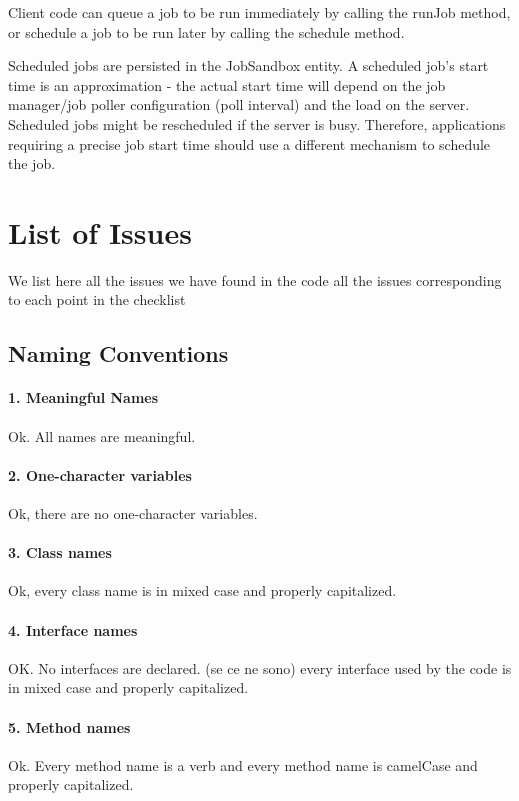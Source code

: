 \documentclass[english]{article}
\begin{document}
Client code can queue a job to be run immediately by calling the runJob method, or schedule a job to be run later by calling the schedule method. 

Scheduled jobs are persisted in the JobSandbox entity. A scheduled job's start time is an approximation - the actual start time will depend on the job manager/job poller configuration (poll interval) and the load on the server.
Scheduled jobs might be rescheduled if the server is busy. Therefore, applications requiring a precise job start time should use a different mechanism to schedule the job.

\section{List of Issues} %
We list here all the issues we have found in the code
all the issues corresponding to each point in the checklist


\subsection{Naming Conventions}

\paragraph{1. Meaningful Names}
Ok. All names are meaningful.

\paragraph{2. One-character variables}
Ok, there are no one-character variables.

\paragraph{3. Class names}
Ok, every class name is in mixed case and properly capitalized.

\paragraph{4. Interface names}
OK. No interfaces are declared.
(se ce ne sono) every interface used by the code is in mixed case and properly capitalized.

\paragraph{5. Method names}
Ok. Every method name is a verb and every method name is camelCase and properly capitalized.
\end{document}
